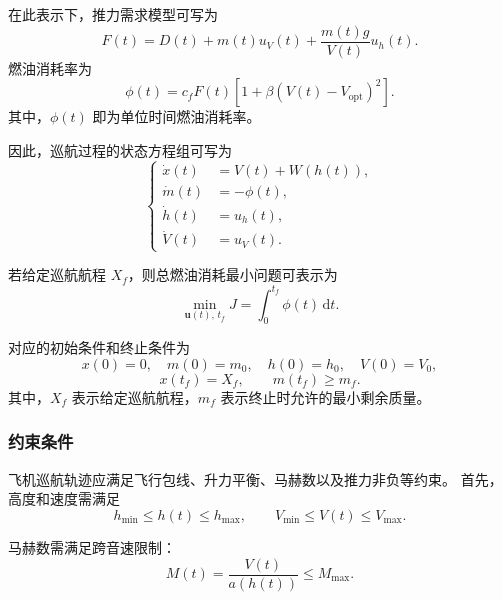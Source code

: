\documentclass[withoutpreface,bwprint]{cumcmthesis} %
\begin{document}
在此表示下，推力需求模型可写为
\begin{equation}
    F(t)
    =
    D(t)+m(t)u_V(t)+\frac{m(t)g}{V(t)}u_h(t).
    \label{eq:q3_thrust}
\end{equation}
燃油消耗率为
\begin{equation}
    \phi(t)
    =
    c_fF(t)
    \left[
    1+\beta\left(V(t)-V_{\mathrm{opt}}\right)^2
    \right].
    \label{eq:q3_phi}
\end{equation}
其中，$\phi(t)$ 即为单位时间燃油消耗率。

因此，巡航过程的状态方程组可写为
\begin{equation}
\left\{
\begin{aligned}
    \dot x(t) &= V(t)+W(h(t)),\\
    \dot m(t) &= -\phi(t),\\
    \dot h(t) &= u_h(t),\\
    \dot V(t) &= u_V(t).
\end{aligned}
\right.
\label{eq:q3_state_equations}
\end{equation}

若给定巡航航程 $X_f$，则总燃油消耗最小问题可表示为
\begin{equation}
    \min_{\boldsymbol{u}(t),\,t_f}
    J
    =
    \int_{0}^{t_f}\phi(t)\,\mathrm{d}t.
    \label{eq:q3_objective}
\end{equation}

对应的初始条件和终止条件为
\begin{equation}
    x(0)=0,\quad m(0)=m_0,\quad h(0)=h_0,\quad V(0)=V_0,
    \label{eq:q3_initial}
\end{equation}
\begin{equation}
    x(t_f)=X_f,\qquad m(t_f)\geq m_f.
    \label{eq:q3_terminal}
\end{equation}
其中，$X_f$ 表示给定巡航航程，$m_f$ 表示终止时允许的最小剩余质量。

\subsubsection{约束条件}

飞机巡航轨迹应满足飞行包线、升力平衡、马赫数以及推力非负等约束。
首先，高度和速度需满足
\begin{equation}
    h_{\min}\leq h(t)\leq h_{\max},
    \qquad
    V_{\min}\leq V(t)\leq V_{\max}.
    \label{eq:q3_hV_bounds}
\end{equation}

马赫数需满足跨音速限制：
\begin{equation}
    M(t)=\frac{V(t)}{a(h(t))}\leq M_{\max}.
    \label{eq:q3_mach_constraint}
\end{equation}
\end{document}
